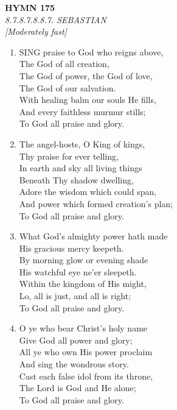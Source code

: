 \documentclass[11pt,a4paper]{article}
\begin{document}
\newpage
\begin{center}
    {\Large \textbf{HYMN 175}}
    \\
    \textit{8.7.8.7.8.8.7. SEBASTIAN}
    \\
    \textit{\small [Moderately fast]}
\end{center}
\vspace{1em}

\begin{enumerate}
    \item SING praise to God who reigns above, \\
        The God of all creation, \\
        The God of power, the God of love, \\
        The God of our salvation. \\
        With healing balm our souls He fills, \\
        And every faithless murmur stills; \\
        To God all praise and glory.

    \item The angel-hosts, O King of kings, \\
        Thy praise for ever telling, \\
        In earth and sky all living things \\
        Beneath Thy shadow dwelling, \\
        Adore the wisdom which could span, \\
        And power which formed creation's plan; \\
        To God all praise and glory.

    \item What God's almighty power hath made \\
        His gracious mercy keepeth. \\
        By morning glow or evening shade \\
        His watchful eye ne'er sleepeth. \\
        Within the kingdom of His might, \\
        Lo, all is just, and all is right; \\
        To God all praise and glory.

    \item O ye who bear Christ's holy name \\
        Give God all power and glory; \\
        All ye who own His power proclaim \\
        And sing the wondrous story. \\
        Cast each false idol from its throne, \\
        The Lord is God and He alone; \\
        To God all praise and glory.

\end{enumerate}
\end{document}
